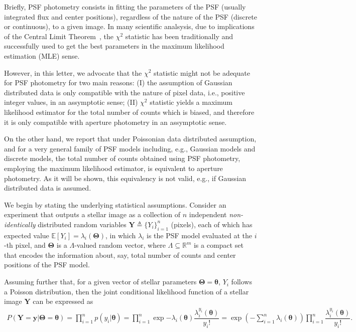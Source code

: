 \documentclass{rnaastex}
\begin{document}
Briefly, PSF photometry consists in fitting the parameters of the PSF
(usually integrated flux and center positions), regardless of the nature of the
PSF (discrete or continuous), to a given image. In many scientific analsysis,
due to implications of the Central Limit Theorem~\citep{grimmett:2001}, the
$\chi^2$ statistic has been traditionally and successfully used to get the best
parameters in the maximum likelihood estimation (MLE) sense.

However, in this letter, we advocate that the $\chi^2$ statistic might not be adequate for PSF
photometry for two main reasons: (I) the assumption of Gaussian distributed data is only
compatible with the nature of pixel data, i.e., positive integer values, in an assymptotic sense;
(II) $\chi^2$ statistic yields a maximum likelihood estimator for the total number of counts
which is biased, and therefore it is only compatible with aperture photometry in an assymptotic sense.

On the other hand, we report that under Poissonian data distributed assumption, and for a very
general family of PSF models including, e.g., Gaussian models and discrete models,
the total number of counts obtained using PSF photometry, employing the maximum likelihood
estimator, is equivalent to aperture photometry. As it will be shown, this equivalency is not
valid, e.g., if Gaussian distributed data is assumed.

We begin by stating the underlying statistical assumptions.
Consider an experiment that outputs a stellar image as a collection of $n$ independent \emph{non-identically}
distributed random variables $\bm{Y} \triangleq \{Y_i\}_{i=1}^{n}$ (pixels), each of which has expected value
$\mathbb{E}\left[Y_i\right] = \lambda_i(\bm{\Theta})$, in which $\lambda_i$ is the PSF model evaluated
at the $i$-th pixel, and $\bm{\Theta}$ is a $\Lambda$-valued random vector, where
$\Lambda \subseteq \mathbb{R}^m$ is a compact set that encodes the information about, say, total number
of counts and center positions of the PSF model.

Assuming further that, for a given vector of stellar parameters $\bm{\Theta} = \bm{\theta}$,
$Y_i$ follows a Poisson distribution, then the joint conditional likelihood function of a
stellar image $\bm{Y}$ can be expressed as~\citep{grimmett:2001}
\begin{align}
    P(\bm{Y} = \bm{y} | \bm{\Theta} = \bm{\theta}) = \prod_{i=1}^{n} p(y_i | \bm{\theta}) = \prod_{i=1}^{n} \exp{-\lambda_i(\bm{\theta})}\dfrac{\lambda_i^{y_i}(\bm{\theta})}{y_i!} = \exp\left({-\sum_{i=1}^{n}\lambda_i(\bm{\theta})}\right)\prod_{i=1}^{n}\dfrac{\lambda_i^{y_i}(\bm{\theta})}{y_i!}.
\end{align}
\end{document}
